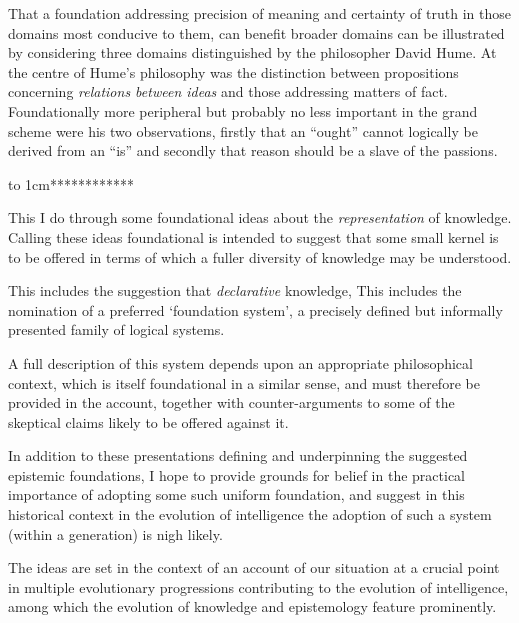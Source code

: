 That a foundation addressing precision of meaning and certainty of truth in those domains most conducive to them, can benefit broader domains can be illustrated by considering three domains distinguished by the philosopher David Hume.
At the centre of Hume's philosophy was the distinction between propositions concerning \emph{relations between ideas} and those addressing matters of fact.
Foundationally more peripheral but probably no less important in the grand scheme were his two observations, firstly that an ``ought'' cannot logically be derived from an ``is'' and secondly that reason should be a slave of the passions.

\vbox to 1cm{\vfil ************* \vfil}

This I do through some foundational ideas about the \emph{representation} of knowledge.
Calling these ideas foundational is intended to suggest that some small kernel is to be offered in terms of which a fuller diversity of knowledge may be understood.

This includes the suggestion that \emph{declarative} knowledge, 
This includes the nomination of a preferred `foundation system', a precisely defined but informally presented family of logical systems.

A full description of this system depends upon an appropriate philosophical context, which is itself foundational in a similar sense, and must therefore be provided in the account, together with counter-arguments to some of the skeptical claims likely to be offered against it.

In addition to these presentations defining and underpinning the suggested epistemic foundations, I hope to provide grounds for belief in the practical importance of adopting some such uniform foundation, and suggest in this historical context in the evolution of intelligence the adoption of such a system (within a generation) is nigh likely.

The ideas are set in the context of an account of our situation at a crucial point in multiple evolutionary progressions contributing to the evolution of intelligence, among which the evolution of knowledge and epistemology feature prominently.


